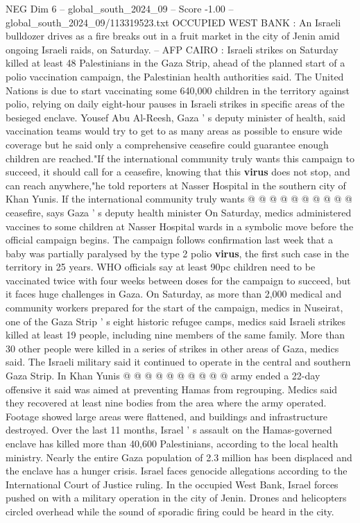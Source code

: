 \begin{textsample}{NEG Dim 6 – global\_south\_2024\_09 – Score -1.00 – global\_south\_2024\_09/113319523.txt}  \label{ex:f6_neg_038}
OCCUPIED WEST BANK : An Israeli bulldozer drives as a fire breaks out in a fruit market in the city of Jenin amid ongoing Israeli raids, on Saturday. -- AFP CAIRO : Israeli strikes on Saturday killed at least 48 Palestinians in the Gaza Strip, ahead of the planned start of a polio vaccination campaign, the Palestinian health authorities said.
The United Nations is due to start vaccinating some 640,000 children in the territory against polio, relying on daily eight-hour pauses in Israeli strikes in specific areas of the besieged enclave.
Yousef Abu Al-Reesh, Gaza ' s deputy minister of health, said vaccination teams would try to get to as many areas as possible to ensure wide coverage but he said only a comprehensive ceasefire could guarantee enough children are reached."If the international community truly wants this campaign to succeed, it should call for a ceasefire, knowing that this \textbf{virus} does not stop, and can reach anywhere,"he told reporters at Nasser Hospital in the southern city of Khan Yunis.
If the international community truly wants @ @ @ @ @ @ @ @ @ @ ceasefire, says Gaza ' s deputy health minister On Saturday, medics administered vaccines to some children at Nasser Hospital wards in a symbolic move before the official campaign begins.
The campaign follows confirmation last week that a baby was partially paralysed by the type 2 polio \textbf{virus}, the first such case in the territory in 25 years.
WHO officials say at least 90pc children need to be vaccinated twice with four weeks between doses for the campaign to succeed, but it faces huge challenges in Gaza.
On Saturday, as more than 2,000 medical and community workers prepared for the start of the campaign, medics in Nuseirat, one of the Gaza Strip ' s eight historic refugee camps, medics said Israeli strikes killed at least 19 people, including nine members of the same family.
More than 30 other people were killed in a series of strikes in other areas of Gaza, medics said.
The Israeli military said it continued to operate in the central and southern Gaza Strip.
In Khan Yunis @ @ @ @ @ @ @ @ @ @ army ended a 22-day offensive it said was aimed at preventing Hamas from regrouping.
Medics said they recovered at least nine bodies from the area where the army operated.
Footage showed large areas were flattened, and buildings and infrastructure destroyed.
Over the last 11 months, Israel ' s assault on the Hamas-governed enclave has killed more than 40,600 Palestinians, according to the local health ministry.
Nearly the entire Gaza population of 2.3 million has been displaced and the enclave has a hunger crisis.
Israel faces genocide allegations according to the International Court of Justice ruling.
In the occupied West Bank, Israel forces pushed on with a military operation in the city of Jenin.
Drones and helicopters circled overhead while the sound of sporadic firing could be heard in the city.

\end{textsample}

